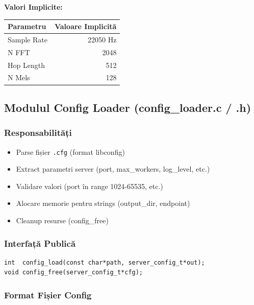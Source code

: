 \documentclass[12pt,a4paper,twoside]{article}
\begin{document}
\textbf{Valori Implicite:}

\begin{table}[H]
    \centering
    \begin{tabular}{|l|r|}
        \toprule
        \textbf{Parametru} & \textbf{Valoare Implicită} \\
        \midrule
        Sample Rate & 22050 Hz \\
        N FFT & 2048 \\
        Hop Length & 512 \\
        N Mels & 128 \\
        \bottomrule
    \end{tabular}
\end{table}

\subsection{Modulul Config Loader (config\_loader.c / .h)}

\subsubsection{Responsabilități}

\begin{itemize}
    \item Parse fișier \texttt{.cfg} (format libconfig)
    \item Extract parametri server (port, max\_workers, log\_level, etc.)
    \item Validare valori (port în range 1024-65535, etc.)
    \item Alocare memorie pentru strings (output\_dir, endpoint)
    \item Cleanup resurse (config\_free)
\end{itemize}

\subsubsection{Interfață Publică}

\begin{lstlisting}
int  config_load(const char*path, server_config_t*out);
void config_free(server_config_t*cfg);
\end{lstlisting}

\subsubsection{Format Fișier Config}
\end{document}
